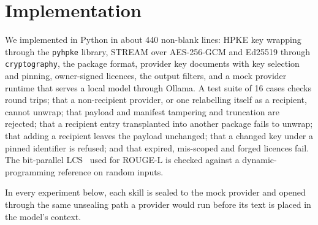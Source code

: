 \section{Implementation}
\label{sec:impl}

We implemented \sys{} in Python in about 440 non-blank lines: HPKE key wrapping through the
\texttt{pyhpke} library, STREAM over AES-256-GCM and Ed25519 through \texttt{cryptography}, the
package format, provider key documents with key selection and pinning, owner-signed licences, the
output filters, and a mock provider runtime that serves a local model through Ollama. A test suite
of 16 cases checks round trips; that a non-recipient provider, or one relabelling itself as a
recipient, cannot unwrap; that payload and manifest tampering and truncation are rejected; that a
recipient entry transplanted into another package fails to unwrap; that adding a recipient leaves
the payload unchanged; that a changed key under a pinned identifier is refused; and that expired,
mis-scoped and forged licences fail. The bit-parallel LCS~\citep{lin2004rouge} used for ROUGE-L is
checked against a dynamic-programming reference on random inputs.

In every experiment below, each skill is sealed to the mock provider and opened through the same
unsealing path a provider would run before its text is placed in the model's context.
